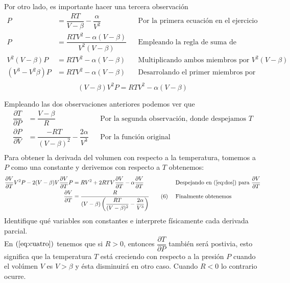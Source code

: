 \documentclass[letterpaper]{article}
\renewcommand{\d}{\partial}
\renewcommand{\*}{\cdot}
\theoremstyle{definition}
\begin{document}
Por otro lado, es importante hacer una tercera observación
\begin{align*}
	P &= \dfrac{RT}{V - \beta} - \dfrac{\alpha}{V^2} &&\text{Por la primera ecuación en el ejercicio}\\
	P &=  \dfrac{RTV^2-\alpha(V- \beta)}{V^2(V - \beta)} &&\text{Empleando la regla de suma de fracciones}\\
	V^2(V - \beta)P &=  RTV^2-\alpha(V- \beta) &&\text{Multiplicando ambos miembros por }V^2(V - \beta)\\
	(V^3 - V^2\beta)P &=  RTV^2-\alpha(V- \beta) &&\text{Desarrolando el primer miembros por distributividad}\\
\end{align*}
\[ (V - \beta)V^2 P = RTV^2 - \alpha(V - \beta) \label{eq:tres}\tag{3}  \]

Empleando las dos observaciones anteriores podemos ver que
\begin{align*}
	\dfrac{\d T}{\d P} &= \dfrac{V - \beta}{R} &&\text{Por la segunda observación, donde despejamos }T \label{eq:cuatro}\tag{4} \\
	\dfrac{\d P}{\d V} &= \dfrac{-RT}{(V - \beta)^2}  - \dfrac{2\alpha}{V^3}&&\text{Por la función original} \label{eq:cinco}\tag{5} \\\
\end{align*}
Para obtener la derivada del volumen con respecto a la temperatura, tomemos a $ P $ como una constante y derivemos con respecto a $ T $ obtenemos:
\begin{align*}
\dfrac{\d V}{\d T} V^2 P - 2 (V - \beta)V\dfrac{\d V}{\d T}P &= RV^2 + 2RTV\dfrac{\d V}{\d T} - \alpha\dfrac{\d V}{\d T}&& \text{Despejando  en (\ref{eq:dos}) para } \dfrac{\d V}{\d T}\\
\dfrac{\d V}{\d T} &= \dfrac{R}{(V - \beta)\left(\dfrac{RT}{(V - \beta)^2} - \dfrac{2\alpha}{V^3}\right) } \label{eq:seis}\tag{6} \ && \text{Finalmente obtenemos} \\
\end{align*}
Identifique qué variables son constantes e interprete físicamente cada derivada parcial.\\

En $ (\ref{eq:cuatro}) $ tenemos que si $ R > 0 $, entonces $ \dfrac{\d T}{\d P} $ también será postivia, esto significa que la temperatura $ T $ está creciendo con respecto a la presión $ P $ cuando el volúmen $ V $ es $ V > \beta $ y ésta disminuirá en otro caso. Cuando $ R<0 $ lo contrario ocurre.\\
\end{document}

